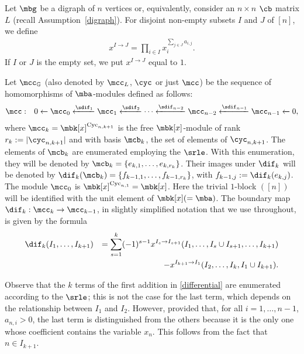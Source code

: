  Let $\mbg$ be a digraph of $n$ vertices or, equivalently,
consider an $n\times n$ $\cb$ matrix $L$ (recall
Assumption~\ref{digraph}). For disjoint non-empty subsets $I$ and $J$
of $[n]$, we define
\begin{eqnarray*}
x^{I\to J}=\prod_{i\in I}x_{i}^{\sum_{j\in J}a_{i,j}}.
\end{eqnarray*}
If $I$ or $J$ is the empty set, we put $x^{I\to J}$ equal to $1$.

\begin{definition}\label{cyccomplex}
Let $\mcc_{\mathbb{G}}$ (also denoted by $\mcc_L$, $\cyc$ or just
$\mcc$) be the sequence of homomorphisms of $\mba$-modules defined as
follows:
\begin{eqnarray*}
\mcc &:& 0\leftarrow \mcc_0\xleftarrow{\sdif_1} \mcc_1
\xleftarrow{\sdif_2} \cdots \xleftarrow{\sdif_{n-2}} \mcc_{n-2}
\xleftarrow{\sdif_{n-1}}\mcc_{n-1}\xleftarrow{} 0,
\end{eqnarray*}
where $\mcc_k=\mbk[x]^{{\rm Cyc}_{n,k+1}}$ is the free
$\mbk[x]$-module of rank $r_k:=\lvert\cyc_{n,k+1}\rvert$ and with
basis $\mcb_{k}$, the set of elements of $\cyc_{n,k+1}$. The elements
of $\mcb_k$ are enumerated employing the $\srle$. With this
enumeration, they will be denoted by $\mcb_{k}=\{e_{k,1},\ldots
,e_{k,r_k}\}$. Their images under $\dif_k$ will be denoted by
$\dif_{k}(\mcb_{k})=\{f_{k-1,1},\ldots ,f_{k-1,r_k}\}$, with
$f_{k-1,j}:=\dif_k(e_{k,j})$. The module $\mcc_0$ is $\mbk[x]^{{\rm
    Cyc}_{n,1}}=\mbk[x]$. Here the trivial $1$-block $([n])$ will be
identified with the unit element of $\mbk[x](=\mba)$.  The boundary
map $\dif_{k}:\mcc_k\to\mcc_{k-1}$, in slightly simplified notation
that we use throughout, is given by the formula
\begin{eqnarray}\label{differential}
\dif_{k}(I_1,\ldots,I_{k+1}) & &= \sum_{s=1}^{k}(-1)^{s-1}x^{I_s\to
  I_{s+1}}(I_1,\ldots ,I_s\cup I_{s+1},\ldots ,I_{k+1}) \\ &&
-x^{I_{k+1}\to I_1}(I_2,\ldots,I_{k},I_1\cup I_{k+1}). \notag
\end{eqnarray}
\end{definition}

\begin{remark}\label{dif-and-enum}
Observe that the $k$ terms of the first addition in
\eqref{differential} are enumerated according to the $\srle$; this is
not the case for the last term, which depends on the relationship
between $I_1$ and $I_2$. However, provided that, for all $i=1,\ldots
,n-1$, $a_{n,i}> 0$, the last term is distinguished from the others
because it is the only one whose coefficient contains the variable
$x_n$. This follows from the fact that $n\in I_{k+1}$.
\end{remark}

